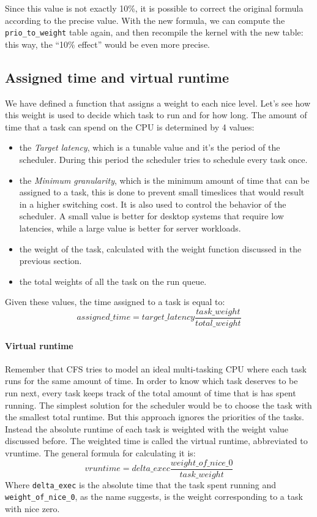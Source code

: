 Since this value is not exactly 10\%, it is possible to correct the original formula according to the precise value. With the new formula, we can compute the \verb|prio_to_weight| table again, and then recompile the kernel with the new table: this way, the ``10\% effect'' would be even more precise.

\subsection{Assigned time and virtual runtime}
We have defined a function that assigns a weight to each nice level. Let's see how this weight is used to decide which task to run and for how long. The amount of time that a task can spend on the CPU is determined by 4 values:
\begin{itemize}
    \item the \textit{Target latency}, which is a tunable value and it's the period of the scheduler. During this period the scheduler tries to schedule every task once. 
    \item the \textit{Minimum granularity}, which is the minimum amount of time that can be assigned to a task, this is done to prevent small timeslices that would result in a higher switching cost. It is also used to control the behavior of the scheduler. A small value is better for desktop systems that require low latencies, while a large value is better for server workloads.
    \item the weight of the task, calculated with the weight function discussed in the previous section.
    \item the total weights of all the task on the run queue.
\end{itemize}
Given these values, the time assigned to a task is equal to: 
\begin{equation} \label{eq:assigned_time}
    assigned\_time = target\_latency                  \frac{task\_weight}{total\_weight}
\end{equation}

\paragraph{Virtual runtime}
Remember that CFS tries to model an ideal multi-tasking CPU where each task runs for the same amount of time. In order to know which task deserves to be run next, every task keeps track of the total amount of time that is has spent running. The simplest solution for the scheduler would be to choose the task with the smallest total runtime. But this approach ignores the priorities of the tasks. Instead the absolute runtime of each task is weighted with the weight value discussed before. The weighted time is called the virtual runtime, abbreviated to vruntime. The general formula for calculating it is:
\begin{equation} \label{eq:vruntime}
    vruntime = delta\_exec \frac{weight\_of\_nice\_0}{task\_weight}
\end{equation}
Where \verb|delta_exec| is the absolute time that the task spent running and \verb|weight_of_nice_0|, as the name suggests, is the weight corresponding to a task with nice zero.

